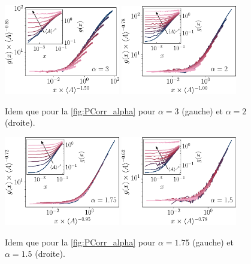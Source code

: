 \begin{figure}[h]
\centering
\includegraphics[width=0.45\textwidth]{Chapitre3/Figures/Interpretation/PCorr/PCorr_rescaled_alpha3_mean.pdf}
\includegraphics[width=0.45\textwidth]{Chapitre3/Figures/Interpretation/PCorr/PCorr_rescaled_alpha2_mean.pdf}
\caption{Idem que pour la \autoref{fig:PCorr_alpha} pour $\alpha = 3$ (gauche) et $\alpha = 2$ (droite).}
\label{fig:PCorrAnnexe5}
\end{figure}

\begin{figure}[h]
\centering
\includegraphics[width=0.45\textwidth]{Chapitre3/Figures/Interpretation/PCorr/PCorr_rescaled_alpha175_mean.pdf}
\includegraphics[width=0.45\textwidth]{Chapitre3/Figures/Interpretation/PCorr/PCorr_rescaled_alpha15_mean.pdf}
\caption{Idem que pour la \autoref{fig:PCorr_alpha} pour $\alpha = 1.75$ (gauche) et $\alpha = 1.5$ (droite).}
\label{fig:PCorrAnnexe5}
\end{figure}

